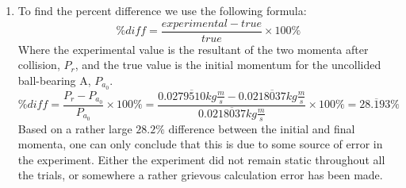 \documentclass[12pt]{article}
\begin{document}
\begin{enumerate}
\item{
To find the percent difference we use the following formula:
\begin{equation}
\%diff=\frac{experimental-true}{true}\times 100\%
\end{equation}
Where the experimental value is the resultant of the two momenta after collision, $P_{r}$, and the true value is the initial momentum for the uncollided ball-bearing A, $P_{a_{0}}$.
\begin{equation}
\%diff=\frac{P_{r}-P_{a_{0}}}{P_{a_{0}}}\times 100\%=\frac{0.0279\overline{5}10kg\frac{m}{s}-0.0218\overline{0}37kg\frac{m}{s}}{0.0218\overline{0}37kg\frac{m}{s}}\times 100\%=28.\overline{1}93\%
\end{equation}
Based on a rather large $28.2\%$ difference between the initial and final momenta, one can only conclude that this is due to some source of error in the experiment. Either the experiment did not remain static throughout all the trials, or somewhere a rather grievous calculation error has been made.}
\end{enumerate}
\end{document}
